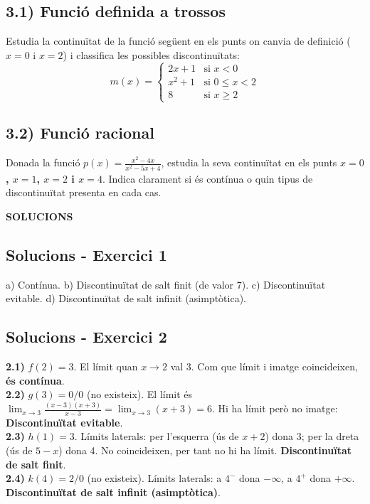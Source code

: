 \documentclass[12pt,a4paper]{article}
\begin{document}
\subsection*{3.1) Funció definida a trossos}
Estudia la continuïtat de la funció següent en els punts on canvia de definició ($x=0$ i $x=2$) i classifica les possibles discontinuïtats:
\[ m(x) = \begin{cases} 2x + 1 & \text{si } x < 0 \\ x^2 + 1 & \text{si } 0 \le x < 2 \\ 8 & \text{si } x \ge 2 \end{cases} \]

\subsection*{3.2) Funció racional}
Donada la funció $p(x) = \frac{x^2 - 4x}{x^2 - 5x + 4}$, estudia la seva continuïtat en els punts \textbf{$x=0$, $x=1$, $x=2$ i $x=4$}. Indica clarament si és contínua o quin tipus de discontinuïtat presenta en cada cas.

\newpage


\begin{center}
    {\Large \textbf{SOLUCIONS}}
\end{center}
\vspace{0.5cm}

\subsection*{Solucions - Exercici 1}
a) Contínua. \quad b) Discontinuïtat de salt finit (de valor 7). \quad c) Discontinuïtat evitable. \quad d) Discontinuïtat de salt infinit (asimptòtica).

\subsection*{Solucions - Exercici 2}
\textbf{2.1)} $f(2) = 3$. El límit quan $x \to 2$ val 3. Com que límit i imatge coincideixen, \textbf{és contínua}. \\
\textbf{2.2)} $g(3) = 0/0$ (no existeix). El límit és $\lim_{x \to 3} \frac{(x-3)(x+3)}{x-3} = \lim_{x \to 3} (x+3) = 6$. Hi ha límit però no imatge: \textbf{Discontinuïtat evitable}. \\
\textbf{2.3)} $h(1) = 3$. Límits laterals: per l'esquerra (ús de $x+2$) dona 3; per la dreta (ús de $5-x$) dona 4. No coincideixen, per tant no hi ha límit. \textbf{Discontinuïtat de salt finit}. \\
\textbf{2.4)} $k(4) = 2/0$ (no existeix). Límits laterals: a $4^-$ dona $-\infty$, a $4^+$ dona $+\infty$. \textbf{Discontinuïtat de salt infinit (asimptòtica)}.
\end{document}

